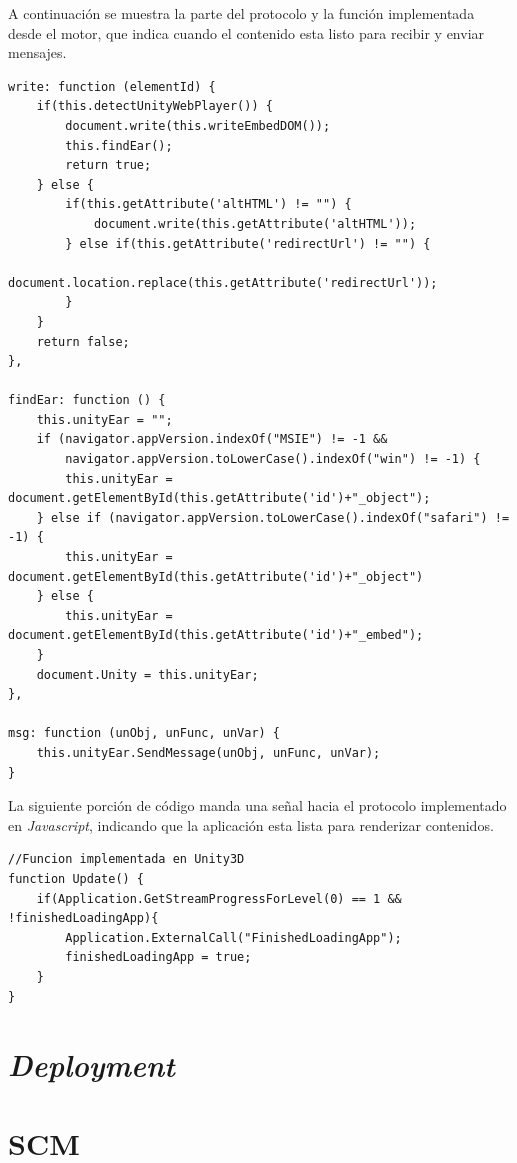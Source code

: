 A continuación se muestra la parte del protocolo y la función implementada desde el motor, que indica cuando el contenido esta listo para recibir y enviar mensajes.

\begin{verbatim}
write: function (elementId) {
    if(this.detectUnityWebPlayer()) {
        document.write(this.writeEmbedDOM());
        this.findEar();
        return true;
    } else {
        if(this.getAttribute('altHTML') != "") {
            document.write(this.getAttribute('altHTML'));
        } else if(this.getAttribute('redirectUrl') != "") {
            document.location.replace(this.getAttribute('redirectUrl'));
        }
    }
    return false;
},

findEar: function () {
    this.unityEar = "";
    if (navigator.appVersion.indexOf("MSIE") != -1 && 
        navigator.appVersion.toLowerCase().indexOf("win") != -1) {
        this.unityEar = document.getElementById(this.getAttribute('id')+"_object");
    } else if (navigator.appVersion.toLowerCase().indexOf("safari") != -1) {
        this.unityEar = document.getElementById(this.getAttribute('id')+"_object")
    } else {
        this.unityEar = document.getElementById(this.getAttribute('id')+"_embed");
    }
    document.Unity = this.unityEar;
},
   
msg: function (unObj, unFunc, unVar) {
    this.unityEar.SendMessage(unObj, unFunc, unVar);
}
\end{verbatim}

La siguiente porción de código manda una señal hacia el protocolo implementado en \emph{Javascript}, indicando que la aplicación esta lista para renderizar contenidos.\\

\begin{verbatim}
//Funcion implementada en Unity3D
function Update() {
    if(Application.GetStreamProgressForLevel(0) == 1 && !finishedLoadingApp){
        Application.ExternalCall("FinishedLoadingApp");
        finishedLoadingApp = true;
    }
}
\end{verbatim}
\section{\emph{Deployment}}



\section{SCM}